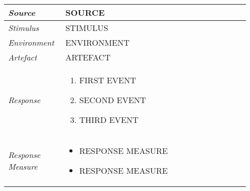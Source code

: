 \vspace{-2mm}
\begin{center}
    \def\arraystretch{1.5}
    \begin{longtable}{ p{0.22\linewidth} p{0.72\linewidth} }
    \hline
        \textit{Source} & \textsf{SOURCE}\\
    \hline
        \textit{Stimulus} & \textsf{STIMULUS}\\
    \hline
    	\textit{Environment} & \textsf{ENVIRONMENT}\\
    \hline
    	\textit{Artefact} & \textsf{ARTEFACT}\\
    \hline
    \textit{Response} &
    \vspace{-5.1mm}
    \begin{enumerate}[itemindent=-9pt, leftmargin=14pt, itemsep=0pt, align=left]
        \item FIRST EVENT
        \item SECOND EVENT
        \item THIRD EVENT
    \end{enumerate} \\ [-5mm]
    \hline
    \textit{Response Measure} &
    \vspace{-8.5mm}
    \begin{itemize}[itemindent=-9pt, leftmargin=14pt, itemsep=0pt, align=left]
       	\item RESPONSE MEASURE
       	\item RESPONSE MEASURE
        \vspace{-5mm}
    \end{itemize}\\
    \hline
    \end{longtable}
\end{center}